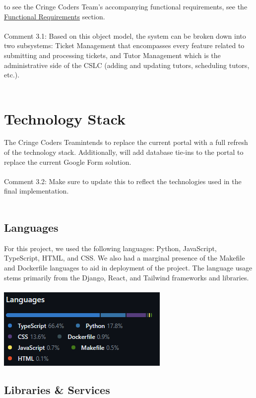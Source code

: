 \documentclass[oneside,openany,obeyspaces]{book}
\newcommand\tab[1][1cm]{\hspace*{#1}}
\newcommand\TeamName{Cringe Coders Team}
\begin{document}
\begin{flushleft}
    \tab to see the \TeamName's accompanying functional requirements, see the \hyperref[sec:Functional Requirements]{Functional Requirements} section.\\~\\
    {\color{red}Comment 3.1: Based on this object model, the system can be broken down into two subsystems: Ticket Management that encompasses every feature related to submitting and processing tickets, and Tutor Management which is the administrative side of the CSLC (adding and updating tutors, scheduling tutors, etc.). \\~\\}

    \section{Technology Stack}

    \tab The \TeamName\space intends to replace the current portal with a full refresh of the technology stack. Additionally, will add database tie-ins to the portal to replace the current Google Form solution.\\~\\
    {\color{red}Comment 3.2: Make sure to update this to reflect the technologies used in the final implementation. \\~\\}

    \subsection{Languages}

    \tab For this project, we used the following languages: Python, JavaScript, TypeScript, HTML, and CSS. We also had a marginal presence of the Makefile and Dockerfile languages to aid in deployment of the project. The language usage stems primarily from the  Django, React, and Tailwind frameworks and libraries.\\~\\
    \includegraphics[width=.25\linewidth]{img/Languages.png}

    \subsection{Libraries \& Services}


\end{flushleft}
\end{document}
